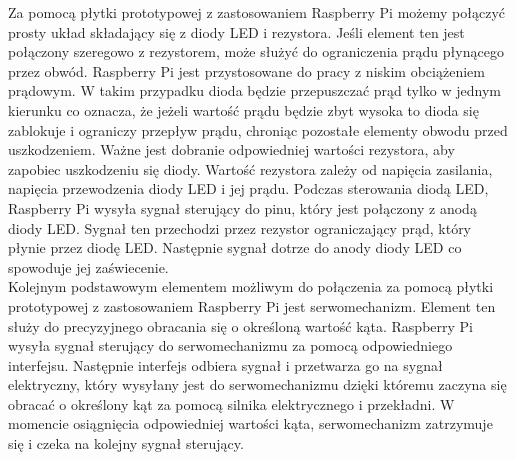 Za pomocą płytki prototypowej z zastosowaniem Raspberry Pi możemy połączyć prosty układ składający się z diody LED i rezystora. Jeśli element ten jest połączony szeregowo z rezystorem, może służyć do ograniczenia prądu płynącego przez obwód. Raspberry Pi jest przystosowane do pracy z niskim obciążeniem prądowym. W takim przypadku dioda będzie przepuszczać prąd tylko w jednym kierunku co oznacza, że jeżeli wartość prądu będzie zbyt wysoka to dioda się zablokuje i ograniczy przepływ prądu, chroniąc pozostałe elementy obwodu przed uszkodzeniem. Ważne jest dobranie odpowiedniej wartości rezystora, aby zapobiec uszkodzeniu się diody. Wartość rezystora zależy od napięcia zasilania, napięcia przewodzenia diody LED i jej prądu. Podczas sterowania diodą LED, Raspberry Pi wysyła sygnał sterujący do pinu, który jest połączony z anodą diody LED. Sygnał ten przechodzi przez rezystor ograniczający prąd, który płynie przez diodę LED. Następnie sygnał dotrze do anody diody LED co spowoduje jej zaświecenie.
\\
	Kolejnym podstawowym elementem możliwym do połączenia za pomocą płytki prototypowej z zastosowaniem Raspberry Pi jest serwomechanizm. Element ten służy do precyzyjnego obracania się o określoną wartość kąta. Raspberry Pi wysyła sygnał sterujący do serwomechanizmu za pomocą odpowiedniego interfejsu. Następnie interfejs odbiera sygnał i przetwarza go na sygnał elektryczny, który wysyłany jest do serwomechanizmu dzięki któremu zaczyna się obracać o określony kąt za pomocą silnika elektrycznego i przekładni. W momencie osiągnięcia odpowiedniej wartości kąta, serwomechanizm zatrzymuje się i czeka na kolejny sygnał sterujący.
